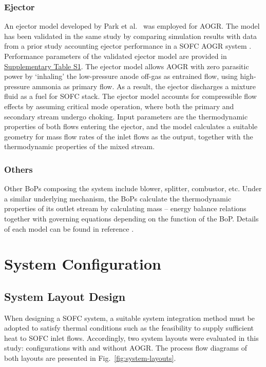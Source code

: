 \documentclass[a4paper,10pt]{cas-dc} %
\begin{document}
\subsubsection{Ejector}

An ejector model developed by Park et al.~\cite{PARK2023232970} was employed for AOGR.
The model has been validated in the same study by comparing simulation results with data from a prior study accounting ejector performance in a SOFC AOGR system \cite{MARSANO2004216}.
Performance parameters of the validated ejector model are provided in \href{Supplementary.pdf}{Supplementary Table S1}.  
The ejector model allows AOGR with zero parasitic power by `inhaling' the low-pressure anode off-gas as entrained flow, using high-pressure ammonia as primary flow.
As a result, the ejector discharges a mixture fluid as a fuel for SOFC stack.
The ejector model accounts for compressible flow effects by assuming critical mode operation, where both the primary and secondary stream undergo choking.
Input parameters are the thermodynamic properties of both flows entering the ejector, and the model calculates a suitable geometry for mass flow rates of the inlet flows as the output, together with the thermodynamic properties of the mixed stream.

\subsubsection{Others}

Other BoPs composing the system include blower, splitter, combustor, etc.
Under a similar underlying mechanism, the BoPs calculate the thermodynamic properties of its outlet stream by calculating mass -- energy balance relations together with governing equations depending on the function of the BoP.
Details of each model can be found in reference \cite{PARK2019351}.

\section{System Configuration}

\subsection{System Layout Design}

When designing a SOFC system, a suitable system integration method must be adopted to satisfy thermal conditions such as the feasibility to supply sufficient heat to SOFC inlet flows.
Accordingly, two system layouts were evaluated in this study: configurations with and without AOGR.
The process flow diagrams of both layouts are presented in Fig.~\ref{fig:system-layouts}.
\end{document}
